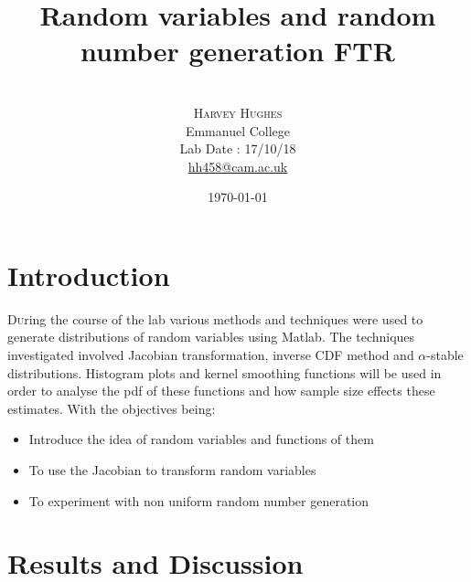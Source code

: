 \documentclass[twoside,twocolumn]{article}
\title{Random variables and random number generation FTR } %
\author{%
\\
\textsc{Harvey Hughes} \\
\normalsize Emmanuel College \\ %
\normalsize Lab Date : 17/10/18\\
\normalsize \href{mailto:hh458@cam.ac.uk}{hh458@cam.ac.uk} %
}
\date{\today} %
\begin{document}
\maketitle


\section{Introduction}
\lettrine[nindent=0em,lines=3]{D}uring the course of the lab various methods and techniques were used to generate distributions of random variables using Matlab. The techniques investigated involved Jacobian transformation, inverse CDF method and $\alpha$-stable distributions. Histogram plots and kernel smoothing functions will be used in order to analyse the pdf of these functions and how sample size effects these estimates. 
\newline
With the objectives being:
\begin{itemize}
\item Introduce the idea of random variables and functions of them\\
\item To use the Jacobian to transform random variables\\
\item To experiment with non uniform random number generation\\
\end{itemize}



\section{Results and Discussion}
\end{document}
